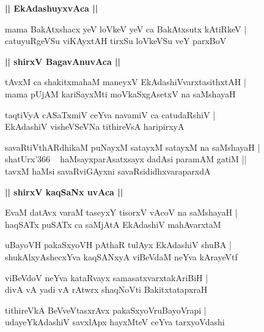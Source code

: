 \documentclass[twoside,12pt,openright]{book}
\newcounter{shloka}[chapter]
\def\uvaca#1{\centerline{{\large\textbf{#1}}}}
\begin{document}
\uvaca{|| EkAdashuyxvAca ||}

\begin{shloka}%
mama BakAtxshacx yeV loVkeV yeV ca BakAtxsutx kAtiRkeV |\\
catuyuRgeVSu viKAyxtAH tirxSu loVkeVSu veY parxBoV 
\end{shloka}

\uvaca{|| shirxV BagavAnuvAca ||}

\begin{shloka}%
tAvxM ca shakitxmahaM maneyxV EkAdashiVvarxtasithxtAH |\\
mama pUjAM kariSayxMti moVkaSxgAsetxV na saMshayaH 
\end{shloka}

\begin{shloka}%
taqtiVyA cASaTxmiV ceYva navamiV ca catudaRshiV |\\
EkAdashiV visheVSeVNa tithireVsA haripirxyA 
\end{shloka}

\begin{shloka}%
savaRtiVthARdhikaM puNayxM satayxM satayxM na saMshayaH |\\
shatUrx\char'366 ~ haMsayxparAsatxsayx dadAsi paramAM gatiM ||\\
tavxM haMsi savaRviGAyxni savaRsididhxvaraparxdA
\end{shloka}

\uvaca{|| shirxV kaqSaNx uvAca ||}

\begin{shloka}%
EvaM datAvx varaM taseyxY tisorxV vAcoV na saMshayaH |\\
haqSATx puSATx ca saMjAtA EkAdashiV mahAvarxtaM 
\end{shloka}

\begin{shloka}%
uBayoVH pakaSxyoVH pAthaR tulAyx EkAdashiV shuBA |\\
shukAlxyAshecxYva kaqSANxyA viBeVdaM neYva kArayeVtf
\end{shloka}

\begin{shloka}%
viBeVdoV neYva kataRvayx samasatxvarxtakAriBiH |\\
divA vA yadi vA rAtwrx shaqNoVti BakitxtatapxraH
\end{shloka}

\begin{shloka}%
tithireVkA BeVveVtasxrAvx pakaSxyoVruBayoVrapi |\\
udayeYkAdashiV savxlApx hayxMteV ceYva tarxyoVdashi
\end{shloka}
\end{document}
